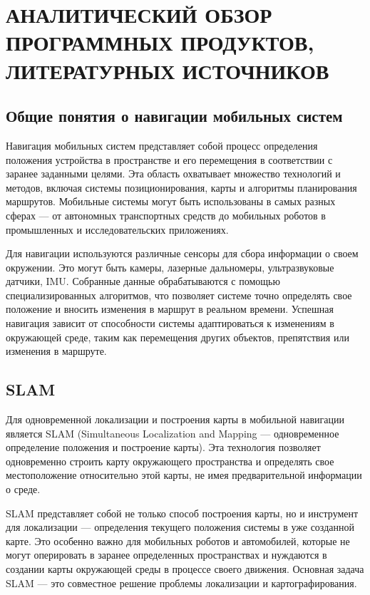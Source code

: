 \section{АНАЛИТИЧЕСКИЙ ОБЗОР ПРОГРАММНЫХ ПРОДУКТОВ, ЛИТЕРАТУРНЫХ ИСТОЧНИКОВ}

\subsection{Общие понятия о навигации мобильных систем}

Навигация мобильных систем представляет собой процесс определения положения
устройства в пространстве и его перемещения в соответствии с заранее заданными
целями. Эта область охватывает множество технологий и методов, включая системы
позиционирования, карты и алгоритмы планирования маршрутов. Мобильные системы
могут быть использованы в самых разных сферах — от автономных транспортных
средств до мобильных роботов в промышленных и исследовательских приложениях.

Для навигации используются различные сенсоры для сбора информации о
своем окружении. Это могут быть камеры, лазерные дальномеры, ультразвуковые
датчики, IMU. Собранные данные обрабатываются с помощью
специализированных алгоритмов, что позволяет системе точно определять свое
положение и вносить изменения в маршрут в реальном времени. Успешная навигация
зависит от способности системы адаптироваться к изменениям в окружающей среде,
таким как перемещения других объектов, препятствия или изменения в маршруте.

\subsection{SLAM}

Для одновременной локализации и построения карты в мобильной навигации является
SLAM (Simultaneous Localization and Mapping — одновременное определение
положения и построение карты). Эта технология позволяет одновременно строить
карту окружающего пространства и определять свое местоположение относительно
этой карты, не имея предварительной информации о среде.

SLAM представляет собой не только способ построения карты, но и инструмент для
локализации — определения текущего положения системы в уже созданной карте. Это
особенно важно для мобильных роботов и автомобилей, которые не могут оперировать
в заранее определенных пространствах и нуждаются в создании карты окружающей
среды в процессе своего движения. Основная задача SLAM — это совместное решение
проблемы локализации и картографирования.

